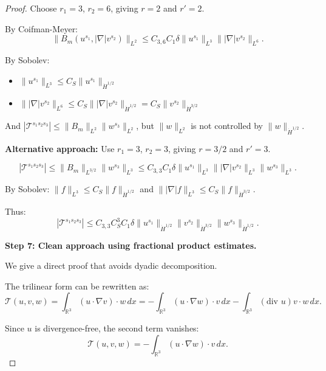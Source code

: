 \documentclass[11pt]{article}
\theoremstyle{definition}
\newcommand{\R}{\mathbb{R}}
\begin{document}
\begin{proof}
Choose $r_1 = 3$, $r_2 = 6$, giving $r = 2$ and $r' = 2$.

By Coifman-Meyer:
\begin{equation}
\|B_m(u^{s_1}, |\nabla|v^{s_2})\|_{L^2} \leq C_{3,6} C_1 \delta \|u^{s_1}\|_{L^3} \||\nabla|v^{s_2}\|_{L^6}.
\end{equation}

By Sobolev:
\begin{itemize}
\item $\|u^{s_1}\|_{L^3} \leq C_S \|u^{s_1}\|_{\dot{H}^{1/2}}$
\item $\||\nabla|v^{s_2}\|_{L^6} \leq C_S \||\nabla|v^{s_2}\|_{\dot{H}^{1/2}} = C_S \|v^{s_2}\|_{\dot{H}^{3/2}}$
\end{itemize}

And $|\mathcal{T}^{s_1 s_2 s_3}| \leq \|B_m\|_{L^2} \|w^{s_3}\|_{L^2}$, but $\|w\|_{L^2}$ is not controlled by $\|w\|_{\dot{H}^{1/2}}$.

\textbf{Alternative approach:} Use $r_1 = 3$, $r_2 = 3$, giving $r = 3/2$ and $r' = 3$.

\begin{equation}
|\mathcal{T}^{s_1 s_2 s_3}| \leq \|B_m\|_{L^{3/2}} \|w^{s_3}\|_{L^3} \leq C_{3,3} C_1 \delta \|u^{s_1}\|_{L^3} \||\nabla|v^{s_2}\|_{L^3} \|w^{s_3}\|_{L^3}.
\end{equation}

By Sobolev: $\|f\|_{L^3} \leq C_S \|f\|_{\dot{H}^{1/2}}$ and $\||\nabla|f\|_{L^3} \leq C_S \|f\|_{\dot{H}^{3/2}}$.

Thus:
\begin{equation}
|\mathcal{T}^{s_1 s_2 s_3}| \leq C_{3,3} C_S^3 C_1 \delta \|u^{s_1}\|_{\dot{H}^{1/2}} \|v^{s_2}\|_{\dot{H}^{3/2}} \|w^{s_3}\|_{\dot{H}^{1/2}}.
\end{equation}

\textbf{Step 7: Clean approach using fractional product estimates.}

We give a direct proof that avoids dyadic decomposition.

The trilinear form can be rewritten as:
\begin{equation}
\mathcal{T}(u,v,w) = \int_{\R^3} (u \cdot \nabla v) \cdot w \, dx = -\int_{\R^3} (u \cdot \nabla w) \cdot v \, dx - \int_{\R^3} (\text{div } u) v \cdot w \, dx.
\end{equation}

Since $u$ is divergence-free, the second term vanishes:
\begin{equation}
\mathcal{T}(u,v,w) = -\int_{\R^3} (u \cdot \nabla w) \cdot v \, dx.
\end{equation}


\end{proof}
\end{document}
